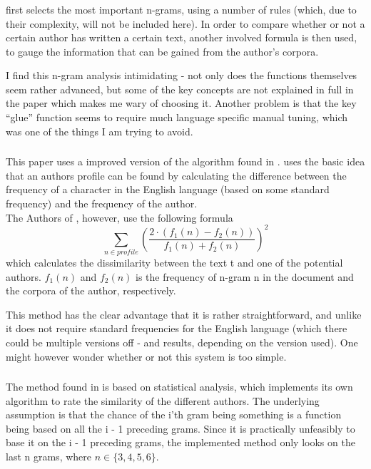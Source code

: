 \subsubsection*{\cite{nr3}}
\cite{nr3} first selects the most important n-grams, using a number of rules (which, due to their complexity, will not be included here). In order to compare whether or not a certain author has written a certain text, another involved formula is then used, to gauge the information that can be gained from the author's corpora.

I find this n-gram analysis intimidating - not only does the functions themselves seem rather advanced, but some of the key concepts are not explained in full in the paper which makes me wary of choosing it. Another problem is that the key ``glue'' function seems to require much language specific manual tuning, which was one of the things I am trying to avoid. 

\subsubsection*{\cite{nr2}}
This paper uses a improved version of the algorithm found in \cite{Bennet}. \cite{Bennet} uses the basic idea that an authors profile can be found by calculating the difference between the frequency of a character in the English language (based on some standard frequency) and the frequency of the author.\\

The Authors of \cite{nr2}, however, use the following formula
$$
\sum_{n \in profile}\left(\frac{2 \cdot (f_1(n) - f_2(n))}{f_1(n) + f_2(n)}\right)^2
$$
which calculates the dissimilarity between the text t and one of the potential authors. $f_1(n)$ and $f_2(n)$ is the frequency of n-gram n in the document and the corpora of the author, respectively. 

This method has the clear advantage that it is rather straightforward, and unlike \cite{Bennet} it does not require standard frequencies for the English language (which there could be multiple versions off - and results, depending on the version used). One might however wonder whether or not this system is too simple.

\subsubsection*{\cite{nr4}}
The method found in \cite{nr4} is  based on statistical analysis, which implements its own algorithm to rate the similarity of the different authors. The underlying assumption is that the chance of the i'th gram being something is a function being based on all the i - 1 preceding grams. Since it is practically unfeasibly to base it on the i - 1 preceding grams, the implemented method only looks on the last n grams, where $n \in \{3,4,5,6 \}$. 

